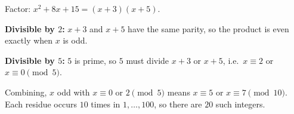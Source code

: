 Factor: $x^2+8x+15=(x+3)(x+5)$.

\textbf{Divisible by $2$:} $x+3$ and $x+5$ have the same parity, so the product is even exactly when $x$ is odd.

\textbf{Divisible by $5$:} $5$ is prime, so $5$ must divide $x+3$ or $x+5$, i.e.\ $x\equiv2$ or $x\equiv0\pmod5$.

Combining, $x$ odd with $x\equiv0$ or $2\pmod 5$ means $x\equiv5$ or $x\equiv7\pmod{10}$. Each residue occurs $10$ times in $1,\dots,100$, so there are $\boxed{20}$ such integers.

